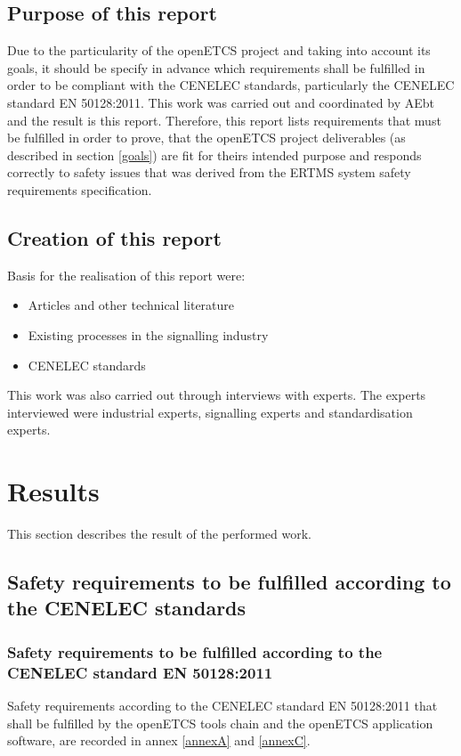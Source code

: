 \documentclass{template/openetcs_report}
\begin{document}
\section{Purpose of this report}
Due to the particularity of the openETCS project and taking into account its goals, it should
be specify in advance which requirements shall be fulfilled in order to be compliant with the
CENELEC standards, particularly the CENELEC standard EN 50128:2011. This work was carried out and coordinated by AEbt and the result is this report. Therefore, this report lists requirements that must be fulfilled in order to prove, that the openETCS project deliverables (as described in section \ref{goals}) are fit for theirs intended purpose and responds correctly to safety issues that was derived from the ERTMS system safety requirements specification.

\section{Creation of this report}
\label{report}
Basis for the realisation of this report were:
\begin{itemize}
  \item Articles and other technical literature
  \item Existing processes in the signalling industry
  \item CENELEC standards
\end{itemize}

This work was also carried out through interviews with experts. The experts interviewed were industrial experts, signalling experts and standardisation experts. 


\chapter{Results}

This section describes the result of the performed work.

\section{Safety requirements to be fulfilled according to the CENELEC standards}

\subsection{Safety requirements to be fulfilled according to the CENELEC standard EN 50128:2011}
Safety requirements according to the CENELEC standard EN 50128:2011 that shall be fulfilled by the openETCS tools chain and the openETCS application software, are recorded in annex \ref{annexA} and \ref{annexC}.
\end{document}
